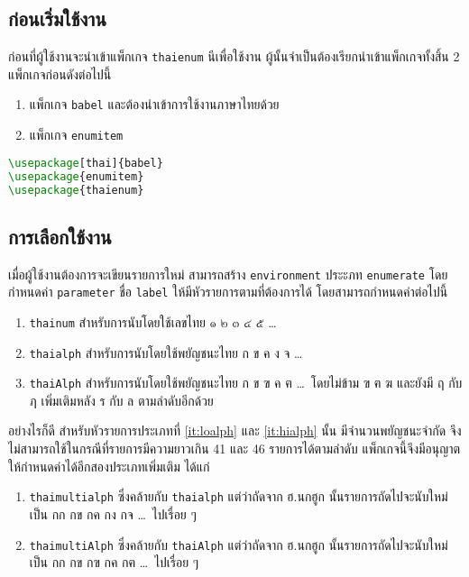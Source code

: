 \documentclass[11pt]{ltxguide}
\begin{document}
\subsection{ก่อนเริ่มใช้งาน}

ก่อนที่ผู้ใช้งานจะนำเข้าแพ็กเกจ \texttt{thaienum} นีเพื่อใช้งาน ผู้นั้นจำเป็นต้องเรียกนำเข้าแพ็กเกจทั้งสิ้น 2 แพ็กเกจก่อนดังต่อไปนี้
\begin{enumerate}[topsep=0.25pc,itemsep=0pc,label={\thainum*.}]
    \item  แพ็กเกจ \texttt{babel} และต้องนำเข้าการใช้งานภาษาไทยด้วย
    \item  แพ็กเกจ \texttt{enumitem}
\end{enumerate}

\begin{lstlisting}[language=LaTeX]
\usepackage[thai]{babel}
\usepackage{enumitem}
\usepackage{thaienum}
\end{lstlisting}

\subsection{การเลือกใช้งาน}

เมื่อผู้ใช้งานต้องการจะเขียนรายการใหม่ สามารถสร้าง \texttt{environment} ประะภท \texttt{enumerate} โดยกำหนดค่า \texttt{parameter} ชื่อ \texttt{label} ให้มีหัวรายการตามที่ต้องการได้ โดยสามารถกำหนดค่าต่อไปนี้

\begin{enumerate}[topsep=0.25pc,itemsep=0pc,label={\thainum*.}]
    \item  \texttt{thainum} สำหรับการนับโดยใช้เลขไทย ๑ ๒ ๓ ๔ ๕ \ldots
    \item  \label{it:loalph} \texttt{thaialph} สำหรับการนับโดยใช้พยัญชนะไทย ก ข ค ง จ \ldots
    \item  \label{it:hialph} \texttt{thaiAlph} สำหรับการนับโดยใช้พยัญชนะไทย ก ข ฃ ค ฅ \ldots\, โดยไม่ข้าม ฃ ฅ ฆ และยังมี ฤ กับ ฦ เพิ่มเติมหลัง ร กับ ล ตามลำดับอีกด้วย
\end{enumerate}

\medskip
อย่างไรก็ดี สำหรับหัวรายการประเภทที่ \ref{it:loalph} และ \ref{it:hialph} นั้น มีจำนวนพยัญชนะจำกัด จึงไม่สามารถใช้ในกรณีที่รายการมีความยาวเกิน 41 และ 46 รายการได้ตามลำดับ แพ็กเกจนี้จึงมีอนุญาตให้กำหนดค่าได้อีกสองประเภทเพิ่มเติม ได้แก่

\begin{enumerate}[topsep=0.25pc,itemsep=0pc,start=4,label={\thainum*.}]
    \item  \texttt{thaimultialph} ซึ่งคล้ายกับ \texttt{thaialph} แต่ว่าถัดจาก ฮ.นกฮูก นั้นรายการถัดไปจะนับใหม่เป็น กก กข กค กง กจ \ldots\, ไปเรื่อย ๆ
    \item  \texttt{thaimultiAlph} ซึ่งคล้ายกับ \texttt{thaiAlph} แต่ว่าถัดจาก ฮ.นกฮูก นั้นรายการถัดไปจะนับใหม่เป็น กก กข กฃ กค กฅ \ldots\, ไปเรื่อย ๆ
\end{enumerate}
\end{document}
